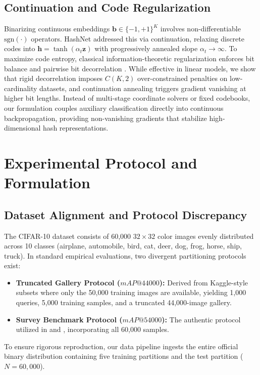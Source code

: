 \documentclass[10pt,conference]{IEEEtran}
\begin{document}
\subsection{Continuation and Code Regularization}
Binarizing continuous embeddings $\mathbf{b} \in \{-1, +1\}^K$ involves non-differentiable $\mathrm{sgn}(\cdot)$ operators. HashNet \cite{cao2017hashnet} addressed this via continuation, relaxing discrete codes into $\mathbf{h} = \tanh(\alpha_t \mathbf{z})$ with progressively annealed slope $\alpha_t \to \infty$. To maximize code entropy, classical information-theoretic regularization enforces bit balance and pairwise bit decorrelation \cite{shen2015supervised,wang2017survey}. While effective in linear models, we show that rigid decorrelation imposes $C(K, 2)$ over-constrained penalties on low-cardinality datasets, and continuation annealing triggers gradient vanishing at higher bit lengths. Instead of multi-stage coordinate solvers or fixed codebooks, our formulation couples auxiliary classification directly into continuous backpropagation, providing non-vanishing gradients that stabilize high-dimensional hash representations.

\section{Experimental Protocol and Formulation}

\subsection{Dataset Alignment and Protocol Discrepancy}
The CIFAR-10 dataset consists of 60,000 $32 \times 32$ color images evenly distributed across 10 classes (airplane, automobile, bird, cat, deer, dog, frog, horse, ship, truck). In standard empirical evaluations, two divergent partitioning protocols exist:
\begin{itemize}
    \item \textbf{Truncated Gallery Protocol ($mAP@44000$):} Derived from Kaggle-style subsets where only the 50,000 training images are available, yielding 1,000 queries, 5,000 training samples, and a truncated 44,000-image gallery.
    \item \textbf{Survey Benchmark Protocol ($mAP@54000$):} The authentic protocol utilized in \cite{dubey2021decade} and \cite{xu2019dha}, incorporating all 60,000 samples.
\end{itemize}
To ensure rigorous reproduction, our data pipeline ingests the entire official binary distribution containing five training partitions and the test partition ($N = 60{,}000$).
\end{document}
